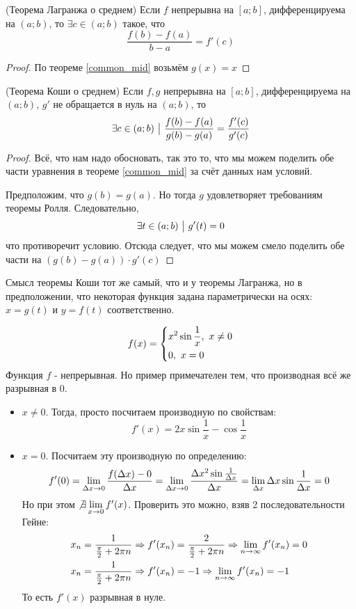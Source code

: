 \begin{corollary} (Теорема Лагранжа о среднем)
	Если $f$ непрерывна на $[a; b]$, дифференцируема на $(a; b)$, то $\exists c \in (a; b)$ такое, что
	\[
		\frac{f(b) - f(a)}{b - a} = f'(c)
	\]
\end{corollary}

\begin{proof}
	По теореме \ref{common_mid} возьмём $g(x) = x$
\end{proof}

\begin{corollary} (Теорема Коши о среднем)
	Если $f, g$ непрерывна на $[a; b]$, дифференцируема на $(a; b)$, $g'$ не обращается в нуль на $(a; b)$, то
	\[
		\exists c \in (a; b) \ \big|\  \frac{f(b) - f(a)}{g(b) - g(a)} = \frac{f'(c)}{g'(c)}
	\]
\end{corollary}

\begin{proof}
	Всё, что нам надо обосновать, так это то, что мы можем поделить обе части уравнения в теореме \ref{common_mid} за счёт данных нам условий.
	
	Предположим, что $g(b) = g(a)$. Но тогда $g$ удовлетворяет требованиям теоремы Ролля. Следовательно,
	\[
		\exists t \in (a; b) \ \big|\  g'(t) = 0
	\]
	что противоречит условию. Отсюда следует, что мы можем смело поделить обе части на $(g(b) - g(a)) \cdot g'(c)$
\end{proof}

\begin{note}
	Смысл теоремы Коши тот же самый, что и у теоремы Лагранжа, но в предположении, что некоторая функция задана параметрически на осях: $x = g(t)$ и $y = f(t)$ соответственно.
\end{note}

\begin{example}
	\[
		f(x) = \left\{\begin{aligned}
			&{x^2 \sin \frac{1}{x},\ x \neq 0}
			\\
			&{0,\ x = 0}
		\end{aligned}\right.
	\]
	Функция $f$ - непрерывная. Но пример примечателен тем, что производная всё же разрывная в 0.
	\begin{itemize}
		\item $x \neq 0$. Тогда, просто посчитаем производную по свойствам:
		\[
			f'(x) = 2x \sin \frac{1}{x} - \cos \frac{1}{x}
		\]
		
		\item $x = 0$. Посчитаем эту производную по определению:
		\[
			f'(0) = \lim\limits_{\Delta x \to 0} \frac{f(\Delta x) - 0}{\Delta x} = \lim\limits_{\Delta x \to 0} \frac{\Delta x^2 \sin \frac{1}{\Delta x}}{\Delta x} = \lim\limits_{\Delta x} \Delta x \sin \frac{1}{\Delta x} = 0
		\]
		Но при этом $\not\exists \lim\limits_{x \to 0} f'(x)$. Проверить это можно, взяв 2 последовательности Гейне:
		\begin{align*}
			&{x_n = \frac{1}{\frac{\pi}{2} + 2\pi n} \Rightarrow f'(x_n) = \frac{2}{\frac{\pi}{2} + 2\pi n} \Rightarrow \lim\limits_{n \to \infty} f'(x_n) = 0}
			\\
			&{x_n = \frac{1}{\frac{\pi}{2} + 2\pi n} \Rightarrow f'(x_n) = -1 \Rightarrow \lim\limits_{n \to \infty} f'(x_n) = -1}
		\end{align*}
		То есть $f'(x)$ разрывная в нуле.
	\end{itemize}
\end{example}

